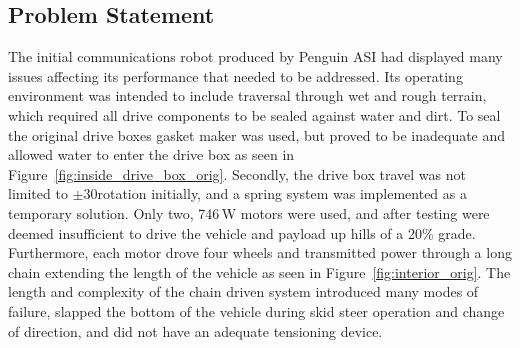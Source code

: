 \subsection{Problem Statement}
The initial communications robot produced by Penguin ASI had displayed many issues affecting its performance that needed to be addressed. Its operating environment was intended to include traversal through wet and rough terrain, which required all drive components to be sealed against water and dirt. To seal the original drive boxes gasket maker was used, but proved to be inadequate and allowed water to enter the drive box as seen in Figure~\ref{fig:inside_drive_box_orig}. Secondly, the drive box travel was not limited to $\pm$30\degree rotation initially, and a spring system was implemented as a temporary solution. Only two, 746\,W motors were used, and after testing were deemed insufficient to drive the vehicle and payload up hills of a 20\% grade. Furthermore, each motor drove four wheels and transmitted power through a long chain extending the length of the vehicle as seen in Figure~\ref{fig:interior_orig}. The length and complexity of the chain driven system introduced many modes of failure, slapped the bottom of the vehicle during skid steer operation and change of direction, and did not have an adequate tensioning device. 
